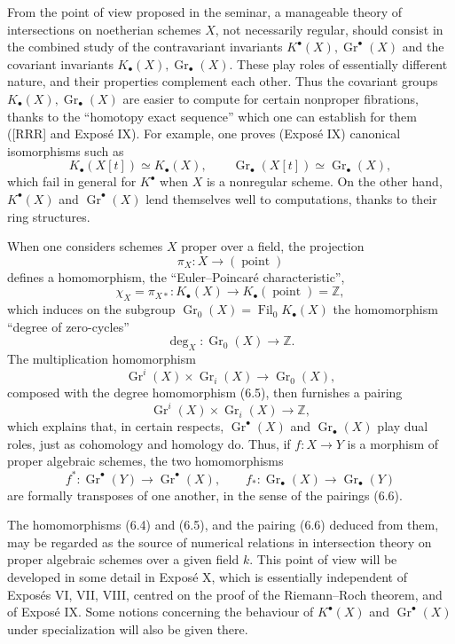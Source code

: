 \documentclass[11pt]{article}
\newcommand{\Gr}{\operatorname{Gr}}
\newcommand{\Fil}{\operatorname{Fil}}
\begin{document}
From the point of view proposed in the seminar, a manageable theory of intersections on noetherian schemes $X$, not necessarily regular, should consist in the combined study of the contravariant invariants $K^\bullet(X),\Gr^\bullet(X)$ and the covariant invariants $K_\bullet(X),\Gr_\bullet(X)$. These play roles of essentially different nature, and their properties complement each other. Thus the covariant groups $K_\bullet(X),\Gr_\bullet(X)$ are easier to compute for certain nonproper fibrations, thanks to the ``homotopy exact sequence'' which one can establish for them ([RRR] and Expos\'e IX). For example, one proves (Expos\'e IX) canonical isomorphisms such as
\[
K_\bullet(X[t])\simeq K_\bullet(X),\qquad \Gr_\bullet(X[t])\simeq \Gr_\bullet(X),
\]
which fail in general for $K^\bullet$ when $X$ is a nonregular scheme. On the other hand, $K^\bullet(X)$ and $\Gr^\bullet(X)$ lend themselves well to computations, thanks to their ring structures.

When one considers schemes $X$ proper over a field, the projection
\[
\pi_X:X\longrightarrow (\operatorname{point})
\]
defines a homomorphism, the ``Euler--Poincar\'e characteristic'',
\begin{equation}\tag{6.4}
\chi_X=\pi_{X*}:K_\bullet(X)\longrightarrow K_\bullet(\operatorname{point})=\mathbb Z,
\end{equation}
which induces on the subgroup $\Gr_0(X)=\Fil_0K_\bullet(X)$ the homomorphism ``degree of zero-cycles''
\begin{equation}\tag{6.5}
\deg_X:\Gr_0(X)\longrightarrow \mathbb Z.
\end{equation}
The multiplication homomorphism
\[
\Gr^i(X)\times \Gr_i(X)\longrightarrow \Gr_0(X),
\]
composed with the degree homomorphism (6.5), then furnishes a pairing
\begin{equation}\tag{6.6}
\Gr^i(X)\times \Gr_i(X)\longrightarrow \mathbb Z,
\end{equation}
which explains that, in certain respects, $\Gr^\bullet(X)$ and $\Gr_\bullet(X)$ play dual roles, just as cohomology and homology do. Thus, if $f:X\to Y$ is a morphism of proper algebraic schemes, the two homomorphisms
\[
f^*:\Gr^\bullet(Y)\longrightarrow \Gr^\bullet(X),\qquad f_*:\Gr_\bullet(X)\longrightarrow \Gr_\bullet(Y)
\]
are formally transposes of one another, in the sense of the pairings (6.6).

The homomorphisms (6.4) and (6.5), and the pairing (6.6) deduced from them, may be regarded as the source of numerical relations in intersection theory on proper algebraic schemes over a given field $k$. This point of view will be developed in some detail in Expos\'e X, which is essentially independent of Expos\'es VI, VII, VIII, centred on the proof of the Riemann--Roch theorem, and of Expos\'e IX. Some notions concerning the behaviour of $K^\bullet(X)$ and $\Gr^\bullet(X)$ under specialization will also be given there.
\end{document}
